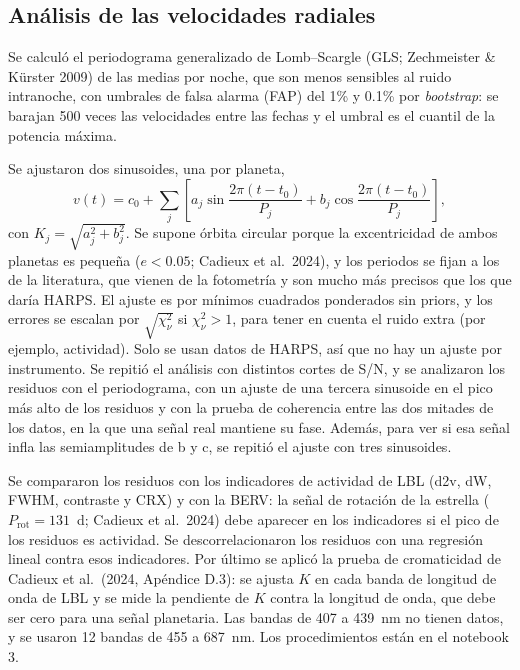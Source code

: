 \documentclass[twocolumn,aps,pra,11pt]{revtex4-2}
\begin{document}
\subsection{Análisis de las velocidades radiales}

Se calculó el periodograma generalizado de Lomb--Scargle (GLS; Zechmeister \& Kürster 2009) de las medias por noche, que son menos sensibles al ruido intranoche, con umbrales de falsa alarma (FAP) del 1\% y 0.1\% por \emph{bootstrap}: se barajan 500 veces las velocidades entre las fechas y el umbral es el cuantil de la potencia máxima.

Se ajustaron dos sinusoides, una por planeta,
\begin{equation}
  v(t) = c_0 + \sum_{j} \left[ a_j \sin\frac{2\pi (t-t_0)}{P_j} + b_j \cos\frac{2\pi (t-t_0)}{P_j}\right],
  \label{eq:sin}
\end{equation}
con $K_j = \sqrt{a_j^2 + b_j^2}$. Se supone órbita circular porque la excentricidad de ambos planetas es pequeña ($e < 0.05$; Cadieux et al.\ 2024), y los periodos se fijan a los de la literatura, que vienen de la fotometría y son mucho más precisos que los que daría HARPS. El ajuste es por mínimos cuadrados ponderados sin priors, y los errores se escalan por $\sqrt{\chi^2_\nu}$ si $\chi^2_\nu>1$, para tener en cuenta el ruido extra (por ejemplo, actividad). Solo se usan datos de HARPS, así que no hay un ajuste por instrumento. Se repitió el análisis con distintos cortes de S/N, y se analizaron los residuos con el periodograma, con un ajuste de una tercera sinusoide en el pico más alto de los residuos y con la prueba de coherencia entre las dos mitades de los datos, en la que una señal real mantiene su fase. Además, para ver si esa señal infla las semiamplitudes de b y c, se repitió el ajuste con tres sinusoides.

Se compararon los residuos con los indicadores de actividad de LBL (d2v, dW, FWHM, contraste y CRX) y con la BERV: la señal de rotación de la estrella ($P_\mathrm{rot} = 131$~d; Cadieux et al.\ 2024) debe aparecer en los indicadores si el pico de los residuos es actividad. Se descorrelacionaron los residuos con una regresión lineal contra esos indicadores. Por último se aplicó la prueba de cromaticidad de Cadieux et al.\ (2024, Apéndice D.3): se ajusta $K$ en cada banda de longitud de onda de LBL y se mide la pendiente de $K$ contra la longitud de onda, que debe ser cero para una señal planetaria. Las bandas de 407 a 439~nm no tienen datos, y se usaron 12 bandas de 455 a 687~nm. Los procedimientos están en el notebook 3.
\end{document}
